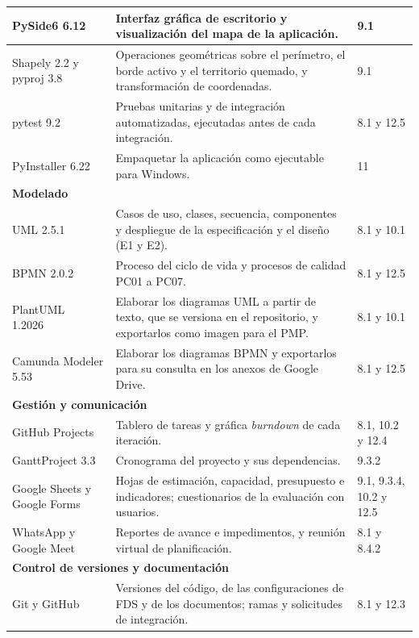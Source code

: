\begin{longtable}{|p{}|p{}|p{}|}
\raggedright PySide6 6.12~\cite{pyside6} & \raggedright Interfaz gráfica de escritorio y visualización del mapa de la aplicación. & \raggedright 9.1\tabularnewline\hline
\raggedright Shapely 2.2 y pyproj 3.8~\cite{shapely,pyproj} & \raggedright Operaciones geométricas sobre el perímetro, el borde activo y el territorio quemado, y transformación de coordenadas. & \raggedright 9.1\tabularnewline\hline
\raggedright pytest 9.2~\cite{pytest} & \raggedright Pruebas unitarias y de integración automatizadas, ejecutadas antes de cada integración. & \raggedright 8.1 y 12.5\tabularnewline\hline
\raggedright PyInstaller 6.22~\cite{pyinstaller} & \raggedright Empaquetar la aplicación como ejecutable para Windows. & \raggedright 11\tabularnewline\hline
\multicolumn{3}{|l|}{\textbf{Modelado}}\tabularnewline\hline
\raggedright UML 2.5.1~\cite{uml} & \raggedright Casos de uso, clases, secuencia, componentes y despliegue de la especificación y el diseño (E1 y E2). & \raggedright 8.1 y 10.1\tabularnewline\hline
\raggedright BPMN 2.0.2~\cite{omg2013bpmn} & \raggedright Proceso del ciclo de vida y procesos de calidad PC01 a PC07. & \raggedright 8.1 y 12.5\tabularnewline\hline
\raggedright PlantUML 1.2026~\cite{plantuml} & \raggedright Elaborar los diagramas UML a partir de texto, que se versiona en el repositorio, y exportarlos como imagen para el PMP. & \raggedright 8.1 y 10.1\tabularnewline\hline
\raggedright Camunda Modeler 5.53~\cite{camundamodeler} & \raggedright Elaborar los diagramas BPMN y exportarlos para su consulta en los anexos de Google Drive. & \raggedright 8.1 y 12.5\tabularnewline\hline
\multicolumn{3}{|l|}{\textbf{Gestión y comunicación}}\tabularnewline\hline
\raggedright GitHub Projects~\cite{githubdocs} & \raggedright Tablero de tareas y gráfica \textit{burndown} de cada iteración. & \raggedright 8.1, 10.2 y 12.4\tabularnewline\hline
\raggedright GanttProject 3.3~\cite{ganttproject} & \raggedright Cronograma del proyecto y sus dependencias. & \raggedright 9.3.2\tabularnewline\hline
\raggedright Google Sheets y Google Forms~\cite{googleworkspace} & \raggedright Hojas de estimación, capacidad, presupuesto e indicadores; cuestionarios de la evaluación con usuarios. & \raggedright 9.1, 9.3.4, 10.2 y 12.5\tabularnewline\hline
\raggedright WhatsApp y Google Meet~\cite{whatsapp,googleworkspace} & \raggedright Reportes de avance e impedimentos, y reunión virtual de planificación. & \raggedright 8.1 y 8.4.2\tabularnewline\hline
\multicolumn{3}{|l|}{\textbf{Control de versiones y documentación}}\tabularnewline\hline
\raggedright Git y GitHub~\cite{chacon2014progit,githubdocs} & \raggedright Versiones del código, de las configuraciones de FDS y de los documentos; ramas y solicitudes de integración. & \raggedright 8.1 y 12.3\tabularnewline\hline

\end{longtable}
